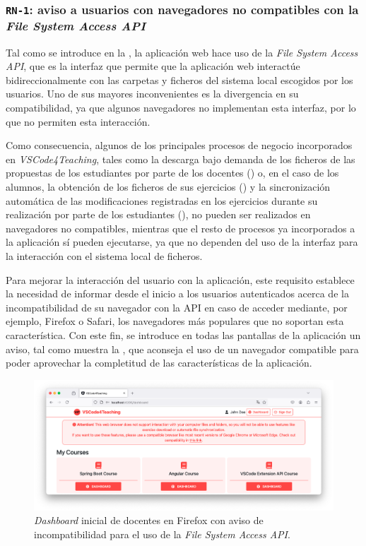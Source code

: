 \subsubsection{\texttt{RN-1}: aviso a usuarios con navegadores no compatibles con la \textit{File System Access API}}
\label{subsec:rn1}

Tal como se introduce en la , la aplicación web hace uso de la \textit{File System Access API}, que es la interfaz que permite que la aplicación web interactúe bidireccionalmente con las carpetas y ficheros del sistema local escogidos por los usuarios. Uno de sus mayores inconvenientes es la divergencia en su compatibilidad, ya que algunos navegadores no implementan esta interfaz, por lo que no permiten esta interacción.

Como consecuencia, algunos de los principales procesos de negocio incorporados en \textit{VSCode4Teaching}, tales como la descarga bajo demanda de los ficheros de las propuestas de los estudiantes por parte de los docentes () o, en el caso de los alumnos, la obtención de los ficheros de sus ejercicios () y la sincronización automática de las modificaciones registradas en los ejercicios durante su realización por parte de los estudiantes (), no pueden ser realizados en navegadores no compatibles, mientras que el resto de procesos ya incorporados a la aplicación sí pueden ejecutarse, ya que no dependen del uso de la interfaz para la interacción con el sistema local de ficheros.

Para mejorar la interacción del usuario con la aplicación, este requisito establece la necesidad de informar desde el inicio a los usuarios autenticados acerca de la incompatibilidad de su navegador con la API en caso de acceder mediante, por ejemplo, Firefox o Safari, los navegadores más populares que no soportan esta característica. Con este fin, se introduce en todas las pantallas de la aplicación un aviso, tal como muestra la , que aconseja el uso de un navegador compatible para poder aprovechar la completitud de las características de la aplicación.

\begin{figure}[ht]
    \centering
    \includegraphics[width=\textwidth]{imagenes/utilizadas/4-3-implementacion/rn1-1.png}
    \caption{\textit{Dashboard} inicial de docentes en Firefox con aviso de incompatibilidad para el uso de la \textit{File System Access API}.}
    \label{fig:reqn1-1}
\end{figure}
